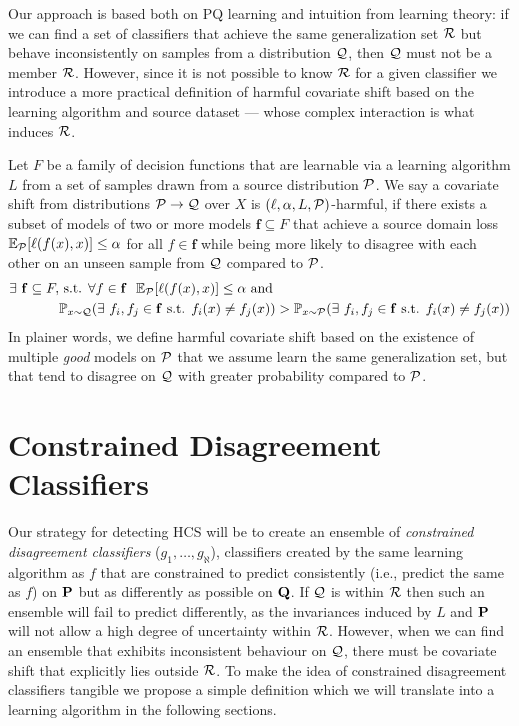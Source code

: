 Our approach is based both on PQ learning and intuition from learning theory: if we can find a set of classifiers that achieve the same generalization
set $\mathcal{R}$ but behave inconsistently on samples from a distribution $\mathcal{Q}$, then $\mathcal{Q}$ must not be a member $\mathcal{R}$.
However, since it is not possible to know $\mathcal{R}$ for a given classifier we introduce a more practical definition of harmful covariate shift
based on the learning algorithm and source dataset --- whose complex interaction is what induces $\mathcal{R}$.

\begin{definition}
    Let $F$ be a family of decision functions that are learnable via a learning algorithm ${L}$ from a set of samples drawn from a source distribution $\mathcal{P}$.
    We say a covariate shift from distributions $\mathcal{P} \to \mathcal{Q}$ over $X$ is $(\ell, \alpha, L, \mathcal{P})$-harmful,
    if there exists a subset of models of two or more models $\mathbf{f} \subseteq F$ that achieve a source domain loss $\mathbb{E}_{\mathcal{P}}[\ell(f(x), x)] \leq \alpha$ for all $f\in \mathbf{f}$ while
    being more likely to disagree with each other on an unseen sample from $\mathcal{Q}$ compared to $\mathcal{P}$.
    \begin{equation}
        \begin{aligned}
            \exists\ \mathbf{f}\subseteq F, &\text{ s.t. } \forall f\in \mathbf{f}\ \ \mathbb{E}_{\mathcal{P}}[\ell(f(x), x)] \leq \alpha \text{ and } \\
            &\mathbb{P}_{x\sim \mathcal{Q}}(\exists\ f_i, f_j \in \mathbf{f}\text{ s.t. }f_i(x)\neq f_j(x)) > \mathbb{P}_{x\sim \mathcal{P}}(\exists\ f_i, f_j \in \mathbf{f}\text{ s.t. }f_i(x)\neq f_j(x))
        \end{aligned}\label{eq:hcs}
    \end{equation}
    In plainer words, we define harmful covariate shift based on the existence of multiple \textit{good} models on $\mathcal{P}$ that we assume learn the same generalization set, but
    that tend to disagree on $\mathcal{Q}$ with greater probability compared to $\mathcal{P}$.
\end{definition}


\section{Constrained Disagreement Classifiers}\label{sec:constrained-disagreement-classifier-(cdc)}
Our strategy for detecting HCS will be to create an ensemble of \textit{constrained disagreement classifiers} ($g_1, \ldots, g_\aleph $),
classifiers created by the same learning algorithm as $f$ that are constrained to predict consistently (i.e., predict the same as $f$) on $\mathbf{P}$ but as differently as possible on $\mathbf{Q}$.
If $\mathcal{Q}$ is within $\mathcal{R}$ then such an ensemble will fail to predict differently, as the invariances induced by $L$ and $\mathbf{P}$ will not allow a high degree of uncertainty within $\mathcal{R}$.
However, when we can find an ensemble that exhibits inconsistent behaviour on $\mathcal{Q}$, there must be covariate shift that explicitly lies outside $\mathcal{R}$.
To make the idea of constrained disagreement classifiers tangible we propose a simple definition which we will translate into a learning algorithm in the following sections.

